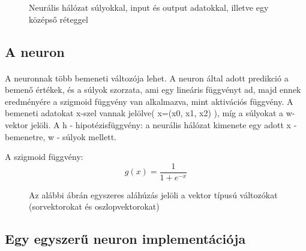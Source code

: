\begin{figure}[t]
  \centering
  \caption[Egyszerű neurális háló]%
  {Neurális hálózat súlyokkal, input és output adatokkal, illetve egy középső réteggel}
  \label{fig:ALAP:sm1}
\end{figure}

\subsection{A neuron}
\paragraph{}
A neuronnak több bemeneti változója lehet. A neuron által adott predikció a bemenő értékek, és a súlyok szorzata, ami egy lineáris függvényt ad, majd ennek eredményére a szigmoid függvény van alkalmazva, mint aktivációs függvény.
A bemeneti adatokat x-szel vannak jelölve( x=(x0, x1, x2) ),  míg a súlyokat a w-vektor jelöli. A h - hipotézisfüggvény: a neurális hálózat kimenete egy adott x - bemenetre, w - súlyok mellett.

A szigmoid függvény:
\[
    g(x) = \frac{1}{1 + e^{-x}}
\]

\begin{figure}[t]
  \centering
  \caption[A neuron]%
  {Az alábbi ábrán egyszeres aláhúzás jelöli a vektor típusú változókat (sorvektorokat és oszlopvektorokat)}
  \label{fig:ALAP:sm1}
\end{figure}

\subsection{Egy egyszerű neuron implementációja}

